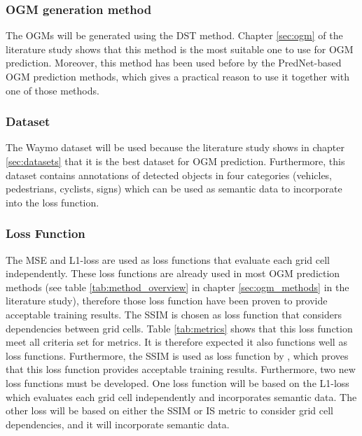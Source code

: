 \subsubsection{\gls{OGM} generation method} 
The \glspl{OGM} will be generated using the \gls{DST} method. Chapter \ref{sec:ogm} of the literature study shows that this method is the most suitable one to use for \gls{OGM} prediction. Moreover, this method has been used before by the PredNet-based \gls{OGM} prediction methods, which gives a practical reason to use it together with one of those methods.  

\subsubsection{Dataset} 
The Waymo \cite{sun2020scalability} dataset will be used because the literature study shows in chapter \ref{sec:datasets} that it is the best dataset for \gls{OGM} prediction. Furthermore, this dataset contains annotations of detected objects in four categories (vehicles, pedestrians, cyclists, signs) which can be used as semantic data to incorporate into the loss function.  

\subsubsection{Loss Function}
The \gls{MSE} and L1-loss are used as loss functions that evaluate each grid cell independently. These loss functions are already used in most \gls{OGM} prediction methods (see table \ref{tab:method_overview} in chapter \ref{sec:ogm_methods} in the literature study), therefore those loss function have been proven to provide acceptable training results. The \gls{SSIM} is chosen as loss function that considers dependencies between grid cells. Table \ref{tab:metrics} shows that this loss function meet all criteria set for metrics. It is therefore expected it also functions well as loss functions. Furthermore, the \gls{SSIM} is used as loss function by \cite{mohajerin2019multi}, which proves that this loss function provides acceptable training results. Furthermore, two new loss functions must be developed. One loss function will be based on the L1-loss which evaluates each grid cell independently and incorporates semantic data. The other loss will be based on either the \gls{SSIM} or \gls{IS} metric to consider grid cell dependencies, and it will incorporate semantic data.

